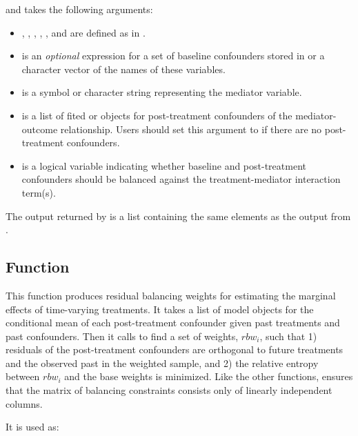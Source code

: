 and takes the following arguments:

\begin{itemize}
\tightlist
\item
  , , , ,
  , and  are defined as in
  .
\item
   is an \emph{optional} expression for a set of
  baseline confounders stored in  or a character vector of
  the names of these variables.
\item
   is a symbol or character string representing the
  mediator variable.
\item
   is a list of fited  or  objects for
  post-treatment confounders of the mediator-outcome relationship. Users
  should set this argument to  if there are no post-treatment
  confounders.
\item
   is a logical variable indicating whether baseline and
  post-treatment confounders should be balanced against the
  treatment-mediator interaction term(s).
\end{itemize}

The output returned by  is a list containing the same
elements as the output from .

\hypertarget{rbwPanel}{%
\subsection{\texorpdfstring{Function
}{Function }}\label{rbwPanel}}

This function produces residual balancing weights for estimating the
marginal effects of time-varying treatments. It takes a list of model
objects for the conditional mean of each post-treatment confounder given
past treatments and past confounders. Then it calls  to find
a set of weights, \(rbw_{i}\), such that 1) residuals of the
post-treatment confounders are orthogonal to future treatments and the
observed past in the weighted sample, and 2) the relative entropy
between \(rbw_{i}\) and the base weights is minimized. Like the other
functions,  ensures that the matrix of balancing
constraints consists only of linearly independent columns.

It is used as:

\\
\hspace*{0.333em}\hspace*{0.333em}\hspace*{0.333em}\hspace*{0.333em}\hspace*{0.333em}\hspace*{0.333em}\hspace*{0.333em}\hspace*{0.333em}\hspace*{0.333em}\hspace*{0.333em}\hspace*{0.333em}

